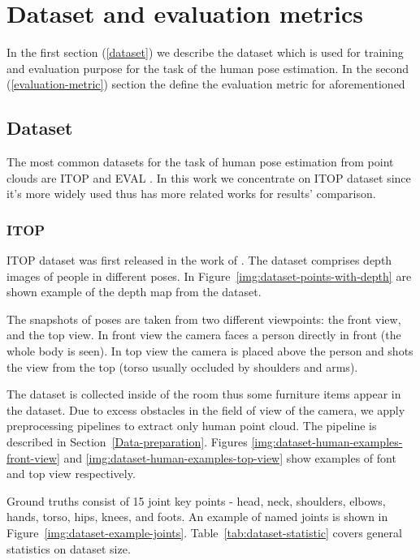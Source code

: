 \chapter{Dataset and evaluation metrics}
\label{Dataset}

In the first section (\ref{dataset}) we describe the dataset which is used for training and evaluation purpose for the task of the human pose estimation.
In the second (\ref{evaluation-metric}) section the define the evaluation metric for aforementioned

\section{Dataset}
The most common datasets for the task of human pose estimation from point clouds are ITOP \parencite{haque_towards_2016} and EVAL \parencite{liu_point_2020}. In this work we concentrate on ITOP dataset since it's more widely used thus has more related works for results' comparison.

\label{dataset}
\subsection{ITOP}

ITOP dataset was first released in the work of \cite{haque_towards_2016}. The dataset comprises depth images of people in different poses. In Figure~\ref{img:dataset-points-with-depth} are shown example of the depth map from the dataset. 

The snapshots of poses are taken from two different viewpoints: the front view, and the top view. In front view the camera faces a person directly in front (the whole body is seen). In top view the camera is placed above the person and shots the view from the top (torso usually occluded by shoulders and arms).

The dataset is collected inside of the room thus some furniture items appear in the dataset. Due to excess obstacles in the field of view of the camera, we apply preprocessing pipelines to extract only human point cloud. The pipeline is described in Section~\ref{Data-preparation}. Figures \ref{img:dataset-human-examples-front-view} and \ref{img:dataset-human-examples-top-view} show examples of font and top view respectively.

Ground truths consist of 15 joint key points - head, neck, shoulders, elbows, hands, torso, hips, knees, and foots. An example of named joints is shown in Figure~\ref{img:dataset-example-joints}. Table~\ref{tab:dataset-statistic} covers general statistics on dataset size.

